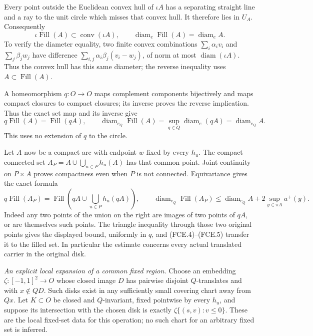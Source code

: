 Every point outside the Euclidean convex hull of $\iota A$
has a separating straight line and a ray to the unit circle
which misses that convex hull. It therefore lies in $U_A$.
Consequently
\[
 \iota\operatorname{Fill}(A)\subset
       \operatorname{conv}(\iota A),\qquad
 \operatorname{diam}_e\operatorname{Fill}(A)
       =\operatorname{diam}_e A.
                                                               \tag{FCE.4}
\]
To verify the diameter equality, two finite convex combinations
$\sum_i\alpha_i v_i$ and $\sum_j\beta_j w_j$ have difference
$\sum_{i,j}\alpha_i\beta_j(v_i-w_j)$, of norm at most
$\operatorname{diam}(\iota A)$. Thus the convex hull has this
same diameter; the reverse inequality uses $A\subset
\operatorname{Fill}(A)$.

A homeomorphism $q:O\to O$ maps complement components
bijectively and maps compact closures to compact closures;
its inverse proves the reverse implication. Thus the exact
set map and its inverse give
\[
 q\operatorname{Fill}(A)=\operatorname{Fill}(qA),\qquad
 \operatorname{diam}_{e_Q}\operatorname{Fill}(A)
       =\sup_{q\in Q}\operatorname{diam}_e(qA)
       =\operatorname{diam}_{e_Q}A.
                                                               \tag{FCE.5}
\]
This uses no extension of $q$ to the circle.

Let $A$ now be a compact arc with endpoint $w$ fixed by
every $h_u$. The compact connected set
$A_P=A\cup\bigcup_{u\in P}h_u(A)$ has that common point.
Joint continuity on $P\times A$ proves compactness even
when $P$ is not connected. Equivariance gives the exact formula
\[
 q\operatorname{Fill}(A_P)=
 \operatorname{Fill}\left(qA\cup\bigcup_{u\in P}h_u(qA)\right),
 \qquad
 \operatorname{diam}_{e_Q}\operatorname{Fill}(A_P)
 \leq\operatorname{diam}_{e_Q}A
            +2\sup_{y\in\pi A}a^+(y).
                                                               \tag{FCE.6}
\]
Indeed any two points of the union on the right are images of
two points of $qA$, or are themselves such points. The triangle
inequality through those two original points gives the displayed
bound, uniformly in $q$, and (FCE.4)--(FCE.5) transfer it to
the filled set. In particular the estimate concerns every
actual translated carrier in the original disk.

\emph{An explicit local expansion of a common fixed region.}
Choose an embedding
$\zeta:[-1,1]^2\to O$ whose closed image $D$ has pairwise
disjoint $Q$-translates and with $x\notin QD$.
Such disks exist in any sufficiently small covering chart
away from $Qx$. Let $K\subset O$ be closed and $Q$-invariant,
fixed pointwise by every $h_u$, and suppose its intersection
with the chosen disk is exactly
$\zeta\{(s,v):v\leq0\}$. These are the local fixed-set data
for this operation; no such chart for an arbitrary fixed set
is inferred.

